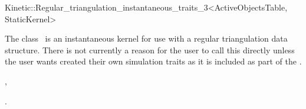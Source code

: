 

\begin{ccRefClass}{Kinetic::Regular_triangulation_instantaneous_traits_3<ActiveObjectsTable, StaticKernel>}


\ccDefinition
  
The class \ccRefName\ is an instantaneous kernel for use with a
regular triangulation data structure. There is not currently a reason
for the user to call this directly unless the user wants created their
own simulation traits as it is included as part of the
.


\ccIsModel

, 

\ccSeeAlso

.

\end{ccRefClass}



